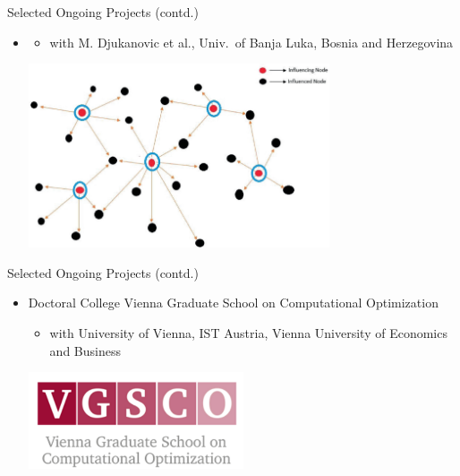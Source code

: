 \documentclass[aspectratio=1610]{beamer}
\begin{document}
\begin{frame}{Selected Ongoing Projects (contd.)}
	\begin{itemize}
	  \itemsep3.5ex
	  \item {}
	  \begin{itemize}
		\item with M. Djukanovic et al., Univ.\ of Banja Luka, Bosnia and Herzegovina
	  \end{itemize}

	  \bigskip
	  \includegraphics[width=0.7\textwidth]{graphics/influence_maximization.png}
	\end{itemize}
\end{frame}
	
\begin{frame}{Selected Ongoing Projects (contd.)}
	\begin{itemize}
	  \itemsep3.5ex
	  \item Doctoral College Vienna Graduate School on Computational Optimization
	  \begin{itemize}
		\item with University of Vienna, IST Austria, Vienna University of Economics and Business
	  \end{itemize}

	  \includegraphics[width=0.5\textwidth]{graphics/vgsco.png}
	\end{itemize}
\end{frame}
	
\end{document}
